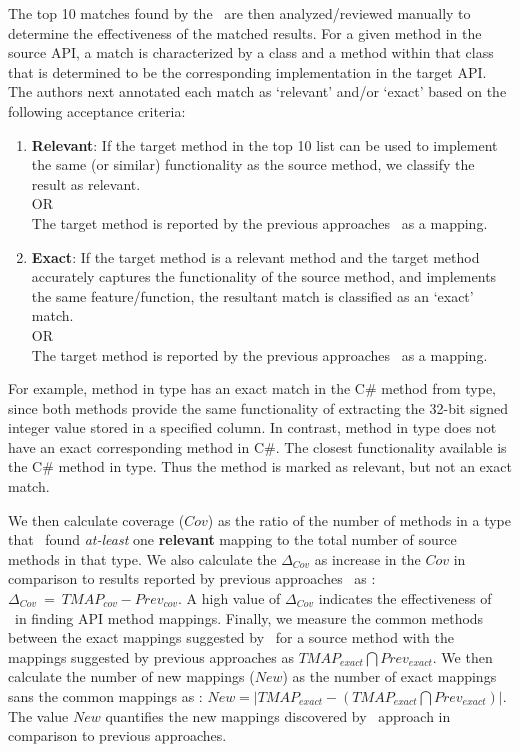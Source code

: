 The top 10 matches found by the \tool\ are then analyzed/reviewed manually to determine the effectiveness of the matched results.
For a given method in the source API, a match is characterized by a class and a method within that class that is determined to be the corresponding implementation in the target API.
The authors next annotated each match as `relevant' and/or `exact' based on the following acceptance criteria:
\begin{enumerate}
	\item{\textbf{Relevant}}: If the target method in the top 10 list can be used to implement the same (or similar) functionality as the source method, we classify the result as relevant.\\
	OR\\
	The target method is reported by the previous approaches~\cite{Gokhale2013ICSE,nguyen2014statistical} as a mapping.

	\item{\textbf{Exact}}: If the target method is a relevant method and the target method accurately captures the functionality of the source method, and implements the same feature/function, the resultant match is classified as an `exact' match.\\
	OR\\
	The target method is reported by the previous approaches~\cite{Gokhale2013ICSE,nguyen2014statistical} as a mapping.
\end{enumerate}

For example,  method in  type has an exact match in the C\# method  from  type, since both methods provide the same functionality of extracting the 32-bit signed integer value stored in a specified column.
In contrast,  method in  type does not have an exact corresponding method in C\#. The closest functionality available is the C\# method  in  type. 
Thus the method  is marked as relevant, but not an exact match.



We then calculate coverage ($Cov$) as the ratio of the number of methods in a type that \tool\ found \textit{at-least} one \textbf{relevant} mapping to the total number of source methods in that type.
We also calculate the $\Delta_{Cov}$ as increase in the $Cov$ in comparison to results reported by previous approaches~\cite{Gokhale2013ICSE,nguyen2014statistical} as : $\Delta_{Cov}\ =\  TMAP_{cov} - Prev_{cov}$.
A high value of $\Delta_{Cov}$ indicates the effectiveness of \tool\ in finding API method mappings.
Finally, we measure the common methods between the exact mappings suggested by \tool\ for a source method with the mappings suggested by previous approaches as $TMAP_{exact}\bigcap Prev_{exact}$.
We then calculate the number of new mappings ($New$) as the number of exact mappings sans the common mappings as : $New =  |TMAP_{exact} - (TMAP_{exact}\bigcap Prev_{exact})|$.
The value $New$ quantifies the new mappings discovered by \tool\ approach in comparison to previous approaches.

